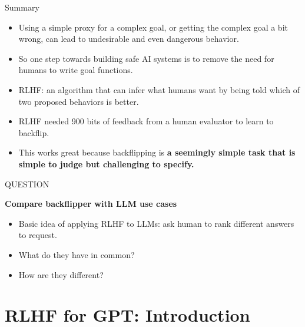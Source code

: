 \begin{vbframe}{Summary}

\vfill

\textbf{}

	\begin{itemize}
		\item Using a simple
		proxy for a complex goal, or getting the
		complex goal a bit wrong, can lead to
		undesirable and even dangerous behavior.
		\item So one step towards building safe AI
		systems is to remove the need for humans to
		write goal functions.
                \item
		RLHF: an algorithm that can infer
		what humans want by being told which of two
		proposed behaviors is better.
\item RLHF needed 900 bits of feedback from a human
		evaluator to learn to backflip.
                \item This works great because backflipping
                is \textbf{a seemingly
	simple task that is simple to judge but challenging
	to specify.}
	\end{itemize}

\vfill

\end{vbframe}

\begin{vbframe}{QUESTION}

\vfill

\textbf{Compare backflipper with LLM use cases}

	\begin{itemize}
        \item Basic idea of applying RLHF to LLMs: ask human
        to rank different answers to request.
		\item What do they have in common?
                \item How are they different?

	\end{itemize}

\vfill

\end{vbframe}






\section{RLHF for GPT: Introduction}


